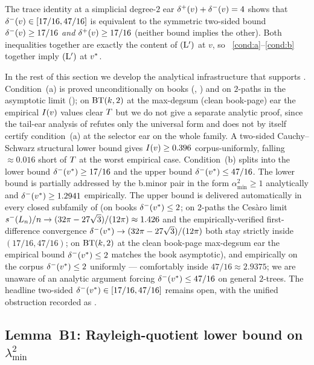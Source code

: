 The trace identity at a simplicial degree-$2$ ear
$\delta^{+}(v) + \delta^{-}(v) = 4$ shows that
$\delta^{-}(v) \in [17/16, 47/16]$ is equivalent to the symmetric
two-sided bound $\delta^{-}(v) \ge 17/16$ \emph{and} $\delta^{+}(v) \ge 17/16$
(neither bound implies the other). Both inequalities together are
exactly the content of $(\mathrm{L}')$ at $v$, so
~\ref{cond:a}--\ref{cond:b} together imply
$(\mathrm{L}')$ at $v^{*}$.

In the rest of this section we develop the analytical infrastructure
that supports . Condition~(a) is proved
unconditionally on books (,
) and on $2$-paths in the asymptotic
limit (); on $\mathrm{BT}(k,2)$ at the
max-degsum (clean book-page) ear the empirical $I(v)$ values clear
$T$ but we do not give a separate analytic proof, since the
tail-ear analysis of  refutes only the
universal form and does not by itself certify condition~(a) at the
selector ear on the whole family. A two-sided
Cauchy--Schwarz structural lower bound  gives
$I(v) \ge 0.396$ corpus-uniformly, falling $\approx 0.016$ short of
$T$ at the worst empirical case. Condition~(b) splits into
the lower bound $\delta^{-}(v^{*}) \ge 17/16$ and the upper bound
$\delta^{-}(v^{*}) \le 47/16$. The lower bound is partially addressed
by the b.minor pair  in the
form $\alpha_{\min}^{2} \ge 1$ analytically and
$\delta^{-}(v^{*}) \ge 1.2941$ empirically. The upper bound is
delivered automatically in every closed subfamily of 
(on books $\delta^{-}(v^{*}) \le 2$; on $2$-paths the Ces\`aro limit
$s^{-}(L_{n})/n \to (32\pi - 27\sqrt{3})/(12\pi) \approx 1.426$ and the
empirically-verified first-difference convergence
$\delta^{-}(v^{*}) \to (32\pi - 27\sqrt{3})/(12\pi)$ both stay strictly
inside $(17/16, 47/16)$; on $\mathrm{BT}(k,2)$ at the clean book-page
max-degsum ear the empirical bound $\delta^{-}(v^{*}) \le 2$ matches
the book asymptotic), and empirically on the corpus $\delta^{-}(v^{*}) \le 2$
uniformly --- comfortably inside $47/16 \approx 2.9375$; we are
unaware of an analytic argument forcing $\delta^{-}(v^{*}) \le 47/16$
on general $2$-trees. The headline two-sided $\delta^{-}(v^{*})
\in [17/16, 47/16]$ remains open, with the unified obstruction
recorded as .

\subsection{Lemma~B1: Rayleigh-quotient lower bound on
\texorpdfstring{$\lambda_{\min}^{2}$}{lambda\_min squared}}\label{sec:moment-form:lemma-B1}

